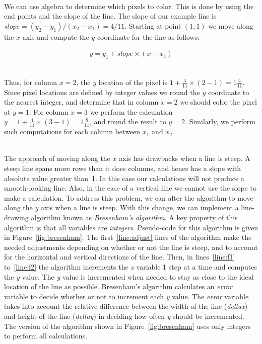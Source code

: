 \documentclass[epsfig,10pt,fullpage]{article}
\begin{document}
~\\
\noindent
We can use algebra to determine which pixels to color. This is done by using the end points and 
the slope of the line. The slope of our example line is $slope = (y_2 - y_1)/(x_2 - x_1) = 4/11$. 
Starting at point $(1,1)$ we move along the $x$ axis and compute the $y$ coordinate for the 
line as follows:

\begin{eqnarray*}
y = y_1 + slope \times (x - x_1)
\end{eqnarray*}

~\\
\noindent
Thus, for column $x = 2$, the $y$ location of the pixel is
$1 + \frac{4}{11} \times (2-1) = 1 \frac{4}{11}$. 
Since pixel locations are defined by integer values we round the $y$ coordinate to the nearest 
integer, and determine that in column $x = 2$ we should color the pixel at $y = 1$. For
column $x = 3$ we perform the calculation $y = 1 + \frac{4}{11} \times (3-1) = 1
\frac{8}{11}$, and round the result to $y = 2$.  Similarly, we perform such computations 
for each column between $x_1$ and $x_2$.

~\\
\noindent
The approach of moving along the $x$ axis has drawbacks when a line is steep. A steep line
spans more rows than it does columns, and hence has a slope with absolute value greater than~1.
In this case our calculations will not produce a smooth-looking line.  Also, in the case
of a vertical line we cannot use the slope to make a calculation.  To address this 
problem, we can alter the algorithm to move along the $y$ axis when a line is steep. With 
this change, we can implement a line-drawing algorithm known as {\it Bresenham's algorithm}.
A key property of this algorithm is that all variables are {\it integers}.
Pseudo-code for this algorithm is given in Figure~\ref{fig:bresenham}. The first~\ref{line:adjust}
lines of the algorithm make the needed adjustments depending on whether or not the line is
steep, and to account for the horizontal and vertical directions of the line. 
Then, in lines~\ref{line:f1} to~\ref{line:f2} the algorithm increments the 
{\it x} variable 1 step at a time
and computes the {\it y} value. The {\it y} value is incremented when needed to stay as
close to the ideal location of the line as possible. Bresenham's algorithm calculates an
{\it error} variable to decide whether or not to increment each {\it y} value. 
The {\it error} variable takes into account the relative difference
between the width of the line ({\it deltax}) and height of the line ({\it deltay}) in deciding
how often {\it y} should be incremented. The version of the algorithm shown in 
Figure~\ref{fig:bresenham} uses only integers to perform all calculations. 
\end{document}
